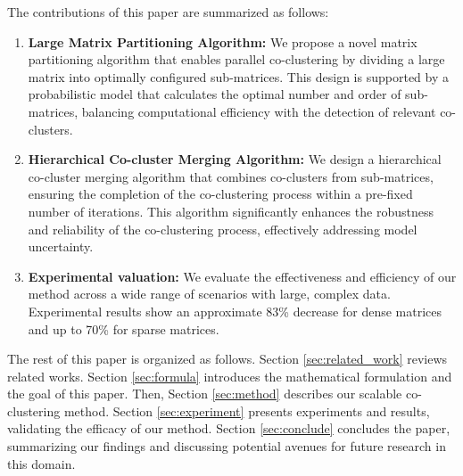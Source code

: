 The contributions of this paper are summarized as follows:
\begin{enumerate}
    \item \textbf{Large Matrix Partitioning Algorithm:}
        We propose a novel matrix partitioning algorithm that enables parallel co-clustering by dividing a large matrix into optimally configured sub-matrices. This design is supported by a probabilistic model that calculates the optimal number and order of sub-matrices, balancing computational efficiency with the detection of relevant co-clusters.
    \item \textbf{Hierarchical Co-cluster Merging Algorithm:}
          We design a hierarchical co-cluster merging algorithm that combines co-clusters from sub-matrices, ensuring the completion of the co-clustering process within a pre-fixed number of iterations. This algorithm significantly enhances the robustness and reliability of the co-clustering process, effectively addressing model uncertainty.
    \item \textbf{Experimental valuation:}
          We evaluate the effectiveness and efficiency of our method across a wide range of scenarios with large, complex data. Experimental results show an approximate 83\% decrease for dense matrices and up to 70\% for sparse matrices.
\end{enumerate}

The rest of this paper is organized as follows. Section \ref{sec:related_work} reviews related works. Section \ref{sec:formula} introduces the mathematical formulation and the goal of this paper. Then, Section \ref{sec:method} describes our scalable co-clustering method. Section \ref{sec:experiment} presents experiments and results, validating the efficacy of our method. Section \ref{sec:conclude} concludes the paper, summarizing our findings and discussing potential avenues for future research in this domain.

